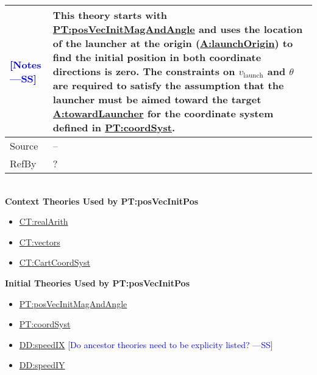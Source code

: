 \documentclass[12pt]{article}
\newcommand{\authornote}[3]{\textcolor{#1}{[#3 ---#2]}}
\newcommand{\authornote}[3]{}
\newcommand{\wss}[1]{\authornote{blue}{SS}{#1}}
\begin{document}
\begin{minipage}{\textwidth}
\begin{tabular}{>{\raggedright}p{}>{\raggedright\arraybackslash}p{}}
\\ \midrule \wss{Notes} & This theory starts with
\hyperref[PT:posVecInitMagAndAngle]{PT:posVecInitMagAndAngle} and uses the
location of the launcher at the origin
(\hyperref[A:launchOrigin]{A:launchOrigin}) to find the initial position in both
coordinate directions is zero. The constraints on $v_\text{launch}$ and $\theta$
are required to satisfy the assumption that the launcher must be aimed toward
the target \hyperref[towardLauncher]{A:towardLauncher} for the coordinate system
defined in \hyperref[PT:coordSyst]{PT:coordSyst}.

\\ \midrule
Source & --
         
\\ \midrule
RefBy & ?

\\ \bottomrule
\end{tabular}
\end{minipage}
~\\

\noindent \textbf{Context Theories Used by PT:posVecInitPos}

\begin{itemize}
\item \hyperref[CT:realArith]{CT:realArith}
\item \hyperref[CT:vectors]{CT:vectors}
\item \hyperref[CT:CartCoordSyst]{CT:CartCoordSyst}
\end{itemize}

\noindent \textbf{Initial Theories Used by PT:posVecInitPos}

\begin{itemize}
\item \hyperref[PT:posVecInitMagAndAngle]{PT:posVecInitMagAndAngle}
\item \hyperref[PT:coordSyst]{PT:coordSyst}
\item \hyperref[DD:speedIX]{DD:speedIX} \wss{Do ancestor theories need to be explicity listed?}
\item \hyperref[DD:speedIY]{DD:speedIY}
\end{itemize}
\end{document}
